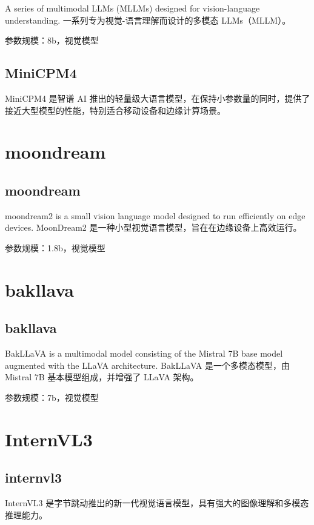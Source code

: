 \documentclass[12pt,UTF8]{ctexbook}
\begin{document}
A series of multimodal LLMs (MLLMs) designed for vision-language understanding.
一系列专为视觉-语言理解而设计的多模态 LLMs（MLLM）。

参数规模：8b，视觉模型

\subsection{MiniCPM4}

MiniCPM4 是智谱 AI 推出的轻量级大语言模型，在保持小参数量的同时，提供了接近大型模型的性能，特别适合移动设备和边缘计算场景。

\section{moondream}

\subsection{moondream}

moondream2 is a small vision language model designed to run efficiently on edge devices.
MoonDream2 是一种小型视觉语言模型，旨在在边缘设备上高效运行。

参数规模：1.8b，视觉模型

\section{bakllava}

\subsection{bakllava}

BakLLaVA is a multimodal model consisting of the Mistral 7B base model augmented with the LLaVA architecture.
BakLLaVA 是一个多模态模型，由 Mistral 7B 基本模型组成，并增强了 LLaVA 架构。

参数规模：7b，视觉模型

\section{InternVL3}

\subsection{internvl3}

InternVL3 是字节跳动推出的新一代视觉语言模型，具有强大的图像理解和多模态推理能力。
\end{document}
